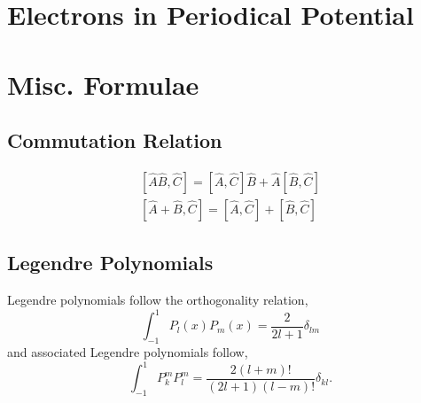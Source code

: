 \documentclass{book}
\begin{document}
\chapter{Electrons in Periodical Potential}
\appendix
\chapter{Misc. Formulae}
\section{Commutation Relation}
\begin{align}
	\left[\hat{A}\hat{B}, \hat{C}\right] = \left[\hat{A}, \hat{C}\right]\hat{B} + \hat{A}\left[\hat{B},\hat{C}\right] \\
	\left[\hat{A} + \hat{B}, \hat{C}\right] = \left[\hat{A}, \hat{C}\right] + \left[\hat{B},\hat{C}\right]
\end{align}
\section{Legendre Polynomials}
Legendre polynomials follow the orthogonality relation,
\begin{equation}
	\int_{-1}^1 P_l(x)P_m(x) = \frac{2}{2l+1}\delta_{lm}
\end{equation}
and associated Legendre polynomials follow,
\begin{equation}
	\int_{-1}^1 P_k^mP_l^m = \frac{2(l+m)!}{(2l+1)(l-m)!}\delta_{kl}.
\end{equation}
\end{document}
